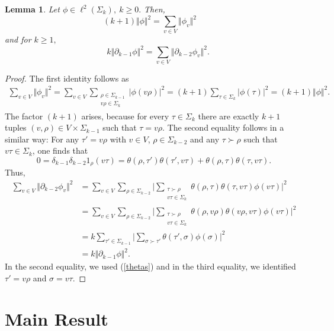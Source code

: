 \documentclass[10pt]{amsart}
\newtheorem{lemma}[theorem]{Lemma}
\theoremstyle{definition}
\begin{document}
\begin{lemma}\label{claims}
    Let $\phi\in\ell^2(\Sigma_k),~k\geq 0.$ Then,
    \[(k+1)\Vert\phi\Vert^2 = \sum_{v\in V}\Vert\phi_v\Vert^2\quad\] 
    and for $k\geq 1,$ \[\quad k\Vert\partial_{k-1}\phi\Vert^2 = \sum_{v\in V}\Vert\partial_{k-2}\phi_v\Vert^2.\]
\end{lemma}
\begin{proof}
    The first identity follows as 
    \begin{align*}
        \sum_{v\in V}\Vert\phi_v\Vert^2 = \sum_{v\in V}\sum_{\substack{\rho\in\Sigma_{k-1}\\v\rho\in\Sigma_k}}\vert\phi(v\rho)\vert^2 = (k+1)\sum_{\tau\in\Sigma_k}\vert\phi(\tau)\vert^2 = (k+1)\Vert\phi\Vert^2.
    \end{align*}
    The factor $(k+1)$ arises, because for every $\tau\in\Sigma_k$ there are exactly $k+1$ tuples $(v,\rho)\in V\times\Sigma_{k-1}$ such that $\tau = v\rho.$
    The second equality follows in a similar way: For any $\tau' = v\rho$ with $v\in V$, $\rho\in\Sigma_{k-2}$ and any $\tau\succ\rho$ such that $v\tau\in\Sigma_k$, one finds that 
    \begin{equation}\label{thetas}
        0 = \delta_{k-1}\delta_{k-2} 1_\rho(v\tau) = \theta(\rho,\tau')\theta(\tau',v\tau)+\theta(\rho,\tau)\theta(\tau,v\tau).
    \end{equation}
    Thus,
    \begin{align*}
        \sum_{v\in V}\Vert\partial_{k-2}\phi_v\Vert^2 &=\sum_{v\in V} \sum_{\rho\in\Sigma_{k-2}}\Big\vert\sum_{\substack{\tau\succ\rho\\v\tau\in\Sigma_k}}\theta(\rho,\tau)\theta(\tau,v\tau)\phi(v\tau)\Big\vert^2\\
        & = \sum_{v\in V}\sum_{\rho\in\Sigma_{k-2}}\Big\vert\sum_{\substack{\tau\succ\rho\\v\tau\in\Sigma_k}}\theta(\rho,v\rho)\theta(v\rho,v\tau)\phi(v\tau)\Big\vert^2\\
        & = k\sum_{\tau'\in\Sigma_{k-1}}\Big\vert\sum_{\sigma\succ\tau'}\theta(\tau',\sigma)\phi(\sigma)\Big\vert^2\\
        &=k\Vert\partial_{k-1}\phi\Vert^2.
    \end{align*}
In the second equality, we used (\ref{thetas}) and in the third equality, we identified $\tau' = v\rho$ and $\sigma = v\tau.$
\end{proof}



\section{Main Result}\label{mainsection}
\end{document}
